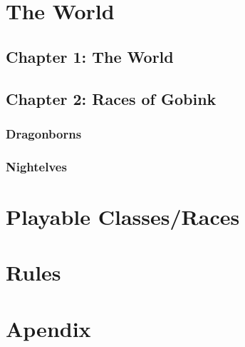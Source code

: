 \documentclass[10pt,twoside,twocolumn,openany]{book}
\begin{document}
\selectfont %




\tableofcontents

\part{The World}
\chapter{Chapter 1: The World}

\newpage
\chapter{Chapter 2: Races of Gobink}
\section{Dragonborns}

\newpage
\section{Nightelves}


\part{Playable Classes/Races}




\part{Rules}


\part{Apendix}


\newpage
\end{document}
